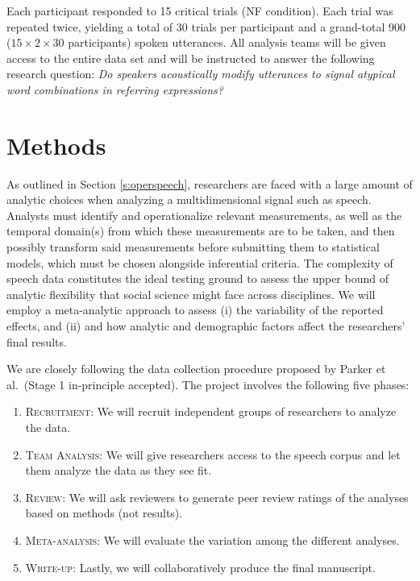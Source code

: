 \documentclass[
  12pt,
]{article}
\providecommand{\tightlist}{%
  \setlength{\itemsep}{0pt}\setlength{\parskip}{0pt}}
\begin{document}
Each participant responded to 15 critical trials (NF condition).
Each trial was repeated twice, yielding a total of 30 trials per participant and a grand-total 900 (\(15 \times 2 \times 30\) participants) spoken utterances.
All analysis teams will be given access to the entire data set and will be instructed to answer the following research question: \emph{Do speakers acoustically modify utterances to signal atypical word combinations in referring expressions?}

\hypertarget{methods}{%
\section{Methods}\label{methods}}

As outlined in Section \ref{s:operspeech}, researchers are faced with a large amount of analytic choices when analyzing a multidimensional signal such as speech.
Analysts must identify and operationalize relevant measurements, as well as the temporal domain(s) from which these measurements are to be taken, and then possibly transform said measurements before submitting them to statistical models, which must be chosen alongside inferential criteria.
The complexity of speech data constitutes the ideal testing ground to assess the upper bound of analytic flexibility that social science might face across disciplines.
We will employ a meta-analytic approach to assess (i) the variability of the reported effects, and (ii) and how analytic and demographic factors affect the researchers' final results.

We are closely following the data collection procedure proposed by Parker et al.~(Stage 1 in-principle accepted).
The project involves the following five phases:

\begin{enumerate}
\def\labelenumi{\arabic{enumi}.}
\tightlist
\item
  \textsc{Recruitment}: We will recruit independent groups of researchers to analyze the data.
\item
  \textsc{Team Analysis}: We will give researchers access to the speech corpus and let them analyze the data as they see fit.
\item
  \textsc{Review}: We will ask reviewers to generate peer review ratings of the analyses based on methods (not results).
\item
  \textsc{Meta-analysis}: We will evaluate the variation among the different analyses.
\item
  \textsc{Write-up}: Lastly, we will collaboratively produce the final manuscript.
\end{enumerate}
\end{document}

